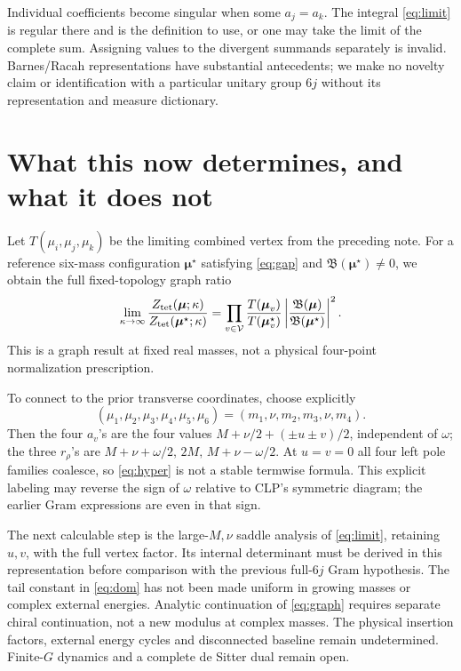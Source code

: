 \documentclass[11pt,a4paper]{article}
\begin{document}
Individual coefficients become singular when some \(a_j=a_k\).
The integral \eqref{eq:limit} is regular there and is the definition
to use, or one may take the limit of the complete sum.
Assigning values to the divergent summands separately is invalid.
Barnes/Racah representations have substantial antecedents; we make
no novelty claim or identification with a particular unitary group
\(6j\) without its representation and measure dictionary.

\section{What this now determines, and what it does not}
Let \(T(\mu_i,\mu_j,\mu_k)\) be the limiting combined vertex from
the preceding note. For a reference six-mass configuration
\(\boldsymbol\mu^\star\) satisfying \eqref{eq:gap} and
\(\mathfrak B(\boldsymbol\mu^\star)\ne0\), we obtain the full
fixed-topology graph ratio
\begin{equation}
 \lim_{\kappa\to\infty}
 \frac{Z_{\rm tet}(\boldsymbol\mu;\kappa)}
      {Z_{\rm tet}(\boldsymbol\mu^\star;\kappa)}
 =
 \prod_{v\in\mathcal V}\frac{T(\boldsymbol\mu_v)}
                            {T(\boldsymbol\mu^\star_v)}
 \left|\frac{\mathfrak B(\boldsymbol\mu)}
              {\mathfrak B(\boldsymbol\mu^\star)}\right|^2.
 \label{eq:graph}
\end{equation}
This is a graph result at fixed real masses, not a physical
four-point normalization prescription.

To connect to the prior transverse coordinates, choose explicitly
\[
 (\mu_1,\mu_2,\mu_3,\mu_4,\mu_5,\mu_6)
 =(m_1,\nu,m_2,m_3,\nu,m_4).
\]
Then the four \(a_v\)'s are the four values
\(M+\nu/2+(\pm u\pm v)/2\), independent of \(\omega\); the three
\(r_\rho\)'s are \(M+\nu+\omega/2,\,2M,\,M+\nu-\omega/2\).
At \(u=v=0\) all four left pole families coalesce, so
\eqref{eq:hyper} is not a stable termwise formula.
This explicit labeling may reverse the sign of \(\omega\) relative
to CLP's symmetric diagram; the earlier Gram expressions are even
in that sign.

The next calculable step is the large-\(M,\nu\) saddle analysis of
\eqref{eq:limit}, retaining \(u,v\), with the full vertex factor.
Its internal determinant must be derived in this representation
before comparison with the previous full-\(6j\) Gram hypothesis.
The tail constant in \eqref{eq:dom} has not been made uniform in
growing masses or complex external energies. Analytic continuation
of \eqref{eq:graph} requires separate chiral continuation, not a new
modulus at complex masses. The physical insertion factors, external
energy cycles and disconnected baseline remain undetermined.
Finite-\(G\) dynamics and a complete de Sitter dual remain open.
\end{document}
